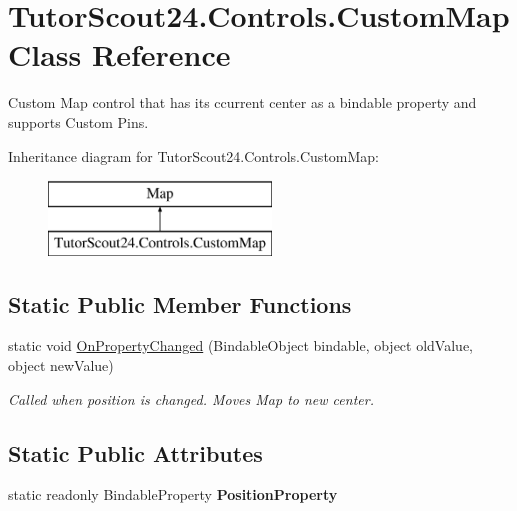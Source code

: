 \hypertarget{class_tutor_scout24_1_1_controls_1_1_custom_map}{}\section{Tutor\+Scout24.\+Controls.\+Custom\+Map Class Reference}
\label{class_tutor_scout24_1_1_controls_1_1_custom_map}


Custom Map control that has its ccurrent center as a bindable property and supports Custom Pins.  


Inheritance diagram for Tutor\+Scout24.\+Controls.\+Custom\+Map\+:\begin{figure}[H]
\begin{center}
\leavevmode
\includegraphics[height=2.000000cm]{class_tutor_scout24_1_1_controls_1_1_custom_map}
\end{center}
\end{figure}
\subsection*{Static Public Member Functions}
\begin{DoxyCompactItemize}
\item 
static void \mbox{\hyperlink{class_tutor_scout24_1_1_controls_1_1_custom_map_a46bd4bc57d2bb8150ab15b3b6337b01b}{On\+Property\+Changed}} (Bindable\+Object bindable, object old\+Value, object new\+Value)
\begin{DoxyCompactList}\small\item\em Called when position is changed. Moves Map to new center. \end{DoxyCompactList}\end{DoxyCompactItemize}
\subsection*{Static Public Attributes}
\begin{DoxyCompactItemize}
\item 
static readonly Bindable\+Property {\bfseries Position\+Property}
\end{DoxyCompactItemize}
